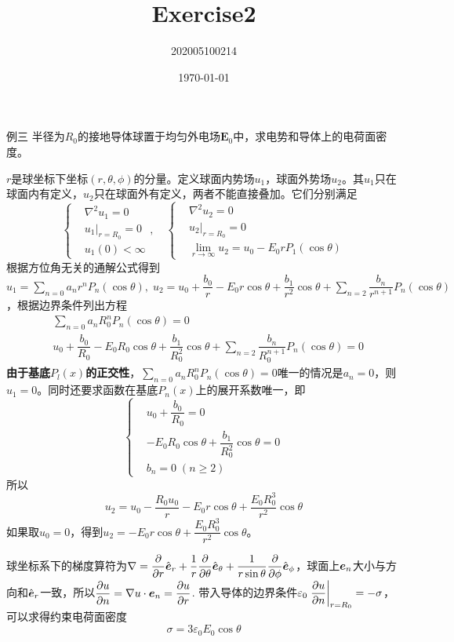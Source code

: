\documentclass{mynote}
\title{Exercise2}
\author{202005100214}
\date\today
\begin{document}
\maketitle



\begin{exercise}{例三}
    半径为$R_0$的接地导体球置于均匀外电场$\bm{E}_0$中，求电势和导体上的电荷面密度。
\end{exercise}
\begin{solution}
    $r$是球坐标下坐标$(r, \theta, \phi)$的分量。定义球面内势场$u_1$，球面外势场$u_2$。其$u_1$只在球面内有定义，$u_2$只在球面外有定义，两者不能直接叠加。它们分别满足
    \[
    \left\{
        \begin{aligned}
            & \nabla ^2 u_1 = 0 \\
            & u_1 |_{r=R_0} = 0 \\
            & u_1(0) < \infty
        \end{aligned} 
    \right.    
    ,\quad 
    \left\{
        \begin{aligned}
            & \nabla ^2 u_2 = 0 \\
            & u_2|_{r=R_0} = 0 \\
            & \lim_{r\to \infty} u_2 = u_0 - E_0 r P_1(\cos \theta)
        \end{aligned} 
    \right.
    \]
    根据方位角无关的通解公式得到$u_1 = \displaystyle\sum_{n=0}a_nr^nP_n(\cos \theta),\; u_2 = u_0 + \dfrac{b_0}{r} - E_0 r \cos \theta + \dfrac{b_1}{r^2} \cos \theta + \displaystyle\sum_{n=2} \dfrac{b_n}{r^{n+1}}P_n(\cos \theta)$，根据边界条件列出方程
    \begin{align*}
        & \sum_{n=0}a_n R_0^n P_n(\cos \theta) = 0 \\
        & u_0 + \dfrac{b_0}{R_0} - E_0 R_0 \cos \theta + \dfrac{b_1}{R_0^2} \cos \theta + \sum_{n=2} \dfrac{b_n}{R_0^{n+1}}P_n(\cos \theta) = 0
    \end{align*}
    \textbf{由于基底$P_l(x)$的正交性}，$\sum_{n=0}a_n R_0^n P_n(\cos \theta) = 0$唯一的情况是$a_n = 0$，则$u_1 = 0$。同时还要求函数在基底$P_n(x)$上的展开系数唯一，即
    \[
    \left\{
        \begin{aligned}
            & u_0 + \dfrac{b_0}{R_0} = 0 \\
            & - E_0 R_0 \cos \theta + \dfrac{b_1}{R_0^2} \cos \theta = 0 \\
            & b_n = 0 \; (n\geq 2)
        \end{aligned} 
    \right.    
    \]
    所以
    \[
    u_2 = u_0 - \dfrac{R_0 u_0}{r} - E_0 r \cos \theta + \dfrac{E_0 R_0^3}{r^2} \cos \theta    
    \]
    如果取$u_0=0$，得到$u_2 = - E_0 r \cos \theta + \dfrac{E_0 R_0^3}{r^2} \cos \theta$。

    球坐标系下的梯度算符为$\nabla = \dfrac{\partial }{\partial r} \hat{\boldsymbol{e}}_r + \dfrac{1}{r}\dfrac{\partial }{\partial \theta} \hat{\boldsymbol{e}}_{\theta} + \dfrac{1}{r\sin \theta} \dfrac{\partial }{\partial \phi} \hat{\boldsymbol{e}}_{\phi}$，球面上$\boldsymbol{e}_n$大小与方向和$\hat{\boldsymbol{e}}_r$一致，所以$\dfrac{\partial u}{\partial n} = \nabla u \cdot \boldsymbol{e}_n = \dfrac{\partial u}{\partial r}$.
    带入导体的边界条件$\varepsilon_0 \left. \dfrac{\partial u}{\partial n} \right|_{r=R_0} = -\sigma$，可以求得约束电荷面密度
    \[
        \sigma = 3 \varepsilon_0 E_0 \cos \theta
    \]
\end{solution}
\end{document}
